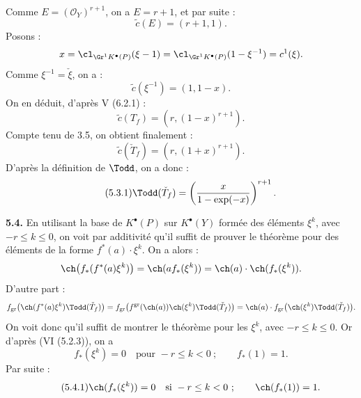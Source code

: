 Comme \(E=(\mathcal O_Y)^{r+1}\), on a \(E=r+1\), et par suite :
\[
 \widetilde c(E)=(r+1,1).
\]
Posons :
\[
 x=\cl_{\Gr^1K^{\bullet}(P)}(\xi-1)
 =
 \cl_{\Gr^1K^{\bullet}(P)}(1-\xi^{-1})
 =
 c^1(\xi).
\]
Comme \(\xi^{-1}=\check \xi\), on a :
\[
 \widetilde c(\xi^{-1})=(1,1-x).
\]
On en déduit, d'après V (6.2.1) :
\[
 \widetilde c(T_f)=(r,(1-x)^{r+1}).
\]
Compte tenu de 3.5, on obtient finalement :
\[
 \widetilde c(\check T_f)=(r,(1+x)^{r+1}).
\]
D'après la définition de \(\Todd\), on a donc :
\begin{equation}\tag{5.3.1}
 \Todd(\check T_f)=
 \left(\frac{x}{1-\exp(-x)}\right)^{r+1}.
\end{equation}

\textbf{5.4.} En utilisant la base de \(K^{\bullet}(P)\) sur \(K^{\bullet}(Y)\) formée des éléments \(\xi^k\), avec \(-r\leq k\leq0\), on voit par additivité qu'il suffit de prouver le théorème pour des éléments de la forme \(f^*(a)\cdot\xi^k\). On a alors :
\[
 \ch\bigl(f_*(f^*(a)\xi^k)\bigr)
 =
 \ch(a f_*(\xi^k))
 =
 \ch(a)\cdot\ch(f_*(\xi^k)).
\]
D'autre part :
\[
 f_{\mathrm{gr}}\bigl(\ch(f^*(a)\xi^k)\Todd(\check T_f)\bigr)
 =
 f_{\mathrm{gr}}\bigl(f^{\mathrm{gr}}(\ch(a))\ch(\xi^k)\Todd(\check T_f)\bigr)
 =
 \ch(a)\cdot f_{\mathrm{gr}}\bigl(\ch(\xi^k)\Todd(\check T_f)\bigr).
\]
On voit donc qu'il suffit de montrer le théorème pour les \(\xi^k\), avec \(-r\leq k\leq0\). Or d'après (VI (5.2.3)), on a
\[
 f_*(\xi^k)=0\quad\text{pour }-r\leq k<0~;\qquad f_*(1)=1.
\]
Par suite :
\begin{equation}\tag{5.4.1}
 \ch(f_*(\xi^k))=0\quad\text{si }-r\leq k<0~;\qquad
 \ch(f_*(1))=1.
\end{equation}

